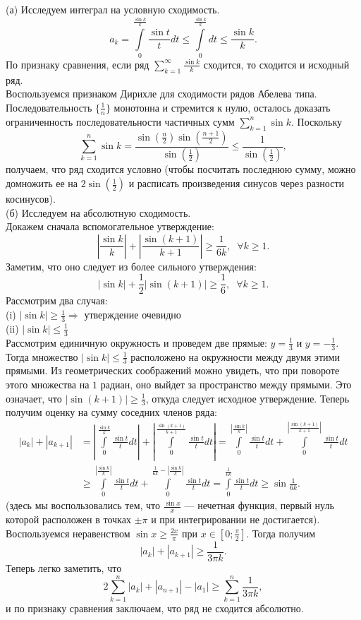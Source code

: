 \documentclass{article}
\begin{document}
(а) Исследуем интеграл на условную сходимость.\\
$$a_k = \int\limits_0^{\frac{\sin k}{k}} \frac{\sin t}{t} dt \leqslant \int\limits_0^{\frac{\sin k}{k}} dt \leqslant \frac{\sin k}{k}.$$
По признаку сравнения, если ряд $\sum\limits_{k=1}^\infty \frac{\sin k}{k}$ сходится, то сходится и исходный ряд.\\
Воспользуемся признаком Дирихле для сходимости рядов Абелева типа. Последовательность $\{\frac{1}{n}\}$ монотонна и стремится к нулю, осталось доказать ограниченность последовательности 
частичных сумм $\sum\limits_{k=1}^n \sin k$. Поскольку
$$\sum\limits_{k=1}^n \sin k = \frac{\sin(\frac{n}{2}) \sin(\frac{n+1}{2})}{\sin(\frac{1}{2})} \leqslant \frac{1}{\sin (\frac12)},$$
получаем, что ряд сходится условно (чтобы посчитать последнюю сумму, можно домножить ее на $2\sin(\frac12)$ и расписать произведения синусов через разности косинусов).\\
(б) Исследуем на абсолютную сходимость.\\
Докажем сначала вспомогательное утверждение:
$$\left| \frac{\sin k}{k} \right| + \left| \frac{\sin (k+1)}{k+1} \right| \geqslant \frac{1}{6k},\;\; \forall k \geqslant 1.$$
Заметим, что оно следует из более сильного утверждения:
$$| \sin k | + \frac12 | \sin (k+1) | \geqslant \frac16,\;\; \forall k \geqslant 1.$$
Рассмотрим два случая:\\
(i) $|\sin k | \geqslant \frac13 \Rightarrow$ утверждение очевидно\\
(ii) $|\sin k| \leqslant \frac13$\\
Рассмотрим единичную окружность и проведем две прямые: $y=\frac13$ и $y=-\frac13$. Тогда множество $|\sin k| \leqslant \frac13$ расположено на окружности между двумя этими прямыми. 
Из геометрических соображений можно увидеть, что при повороте этого множества на $1$ радиан, оно выйдет за пространство между прямыми. Это означает, что $|\sin(k+1)| \geqslant \frac13$, откуда 
следует исходное утверждение.
Теперь получим оценку на сумму соседних членов ряда:
\begin{align*}
|a_k| + |a_{k+1}| &= \left| \int\limits_0^{\frac{\sin k}{k}} \frac{\sin t}{t} dt \right| + \left| \int\limits_0^{\frac{\sin (k+1)}{k+1}} \frac{\sin t}{t} dt \right| = \int\limits_0^{\left| \frac{\sin k}{k} \right|} \frac{\sin t}{t} dt + \int\limits_0^{\left| \frac{\sin (k+1)}{k+1} \right|} \frac{\sin t}{t} dt\\
&\geqslant \int\limits_0^{|\frac{\sin k}{k}|} \frac{\sin t}{t} dt + \int\limits_0^{\frac{1}{6k} - \left| \frac{\sin k}{k} \right|} \frac{\sin t}{t} dt = \int\limits_0^{\frac{1}{6k}} \frac{\sin t}{t} dt \geqslant \sin \frac{1}{6k}.
\end{align*}
(здесь мы воспользовались тем, что $\frac{\sin x}{x}$ --- нечетная функция, первый нуль которой расположен в точках $\pm \pi$ и при интегрировании не достигается).\\
Воспользуемся неравенством $\sin x \geqslant \frac{2x}{\pi}$ при $x \in [0; \frac{\pi}{2}]$. Тогда получим
$$|a_k| + |a_{k+1}| \geqslant \frac{1}{3\pi k}.$$
Теперь легко заметить, что
$$2\sum_{k=1}^n |a_k| + |a_{n+1}| - |a_1| \geqslant \sum_{k=1}^n \frac{1}{3\pi k},$$
и по признаку сравнения заключаем, что ряд не сходится абсолютно.
\end{document}
